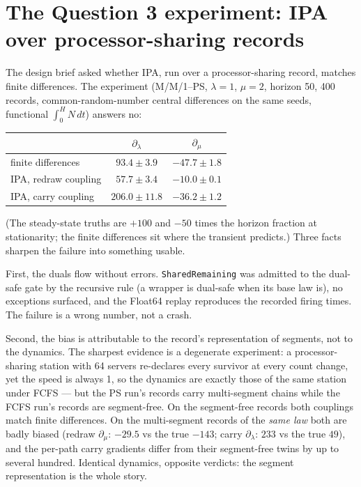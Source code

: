 \documentclass[11pt]{article}
\newcommand{\code}[1]{\texttt{#1}}
\begin{document}
\section{The Question 3 experiment: IPA over processor-sharing records}
\label{sec:ipa-ps}

The design brief asked whether IPA, run over a processor-sharing record,
matches finite differences. The experiment (M/M/1--PS, $\lambda = 1$,
$\mu = 2$, horizon 50, 400 records, common-random-number central
differences on the same seeds, functional $\int_0^H N\,dt$) answers no:

\begin{center}
\small
\begin{tabular}{@{}lcc@{}}
\toprule
 & $\partial_\lambda$ & $\partial_\mu$ \\
\midrule
finite differences & $93.4 \pm 3.9$ & $-47.7 \pm 1.8$ \\
IPA, redraw coupling & $57.7 \pm 3.4$ & $-10.0 \pm 0.1$ \\
IPA, carry coupling & $206.0 \pm 11.8$ & $-36.2 \pm 1.2$ \\
\bottomrule
\end{tabular}
\end{center}

(The steady-state truths are $+100$ and $-50$ times the horizon fraction
at stationarity; the finite differences sit where the transient predicts.)
Three facts sharpen the failure into something usable.

First, the duals flow without errors. \code{SharedRemaining} was admitted
to the dual-safe gate by the recursive rule (a wrapper is dual-safe when
its base law is), no exceptions surfaced, and the Float64 replay
reproduces the recorded firing times. The failure is a wrong number, not
a crash.

Second, the bias is attributable to the record's representation of
segments, not to the dynamics. The sharpest evidence is a degenerate
experiment: a processor-sharing station with 64 servers re-declares every
survivor at every count change, yet the speed is always 1, so the
dynamics are exactly those of the same station under FCFS --- but the PS
run's records carry multi-segment chains while the FCFS run's records are
segment-free. On the segment-free records both couplings match finite
differences. On the multi-segment records of the \emph{same law} both are
badly biased (redraw $\partial_\mu$: $-29.5$ vs the true $-143$; carry
$\partial_\lambda$: $233$ vs the true $49$), and the per-path carry
gradients differ from their segment-free twins by up to several hundred.
Identical dynamics, opposite verdicts: the segment representation is the
whole story.
\end{document}
